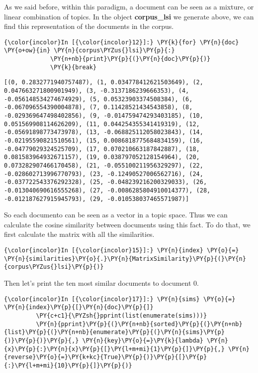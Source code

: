     As we said before, within this paradigm, a document can be seen as a
mixture, or linear combination of topics. In the object
\textbf{corpus\_lsi} we generate above, we can find this representation
of the documents in the corpus.

    \begin{Verbatim}[commandchars=\\\{\}]
{\color{incolor}In [{\color{incolor}12}]:} \PY{k}{for} \PY{n}{doc}  \PY{o+ow}{in} \PY{n}{corpus\PYZus{}lsi}\PY{p}{:}
             \PY{n+nb}{print}\PY{p}{(}\PY{n}{doc}\PY{p}{)}
             \PY{k}{break}
\end{Verbatim}

    \begin{Verbatim}[commandchars=\\\{\}]
[(0, 0.2832771940757487), (1, 0.034778412621503649), (2, 0.047663271800901949), (3, -0.3137186239666353), (4, -0.056148534274674929), (5, 0.05323903374508384), (6, -0.067096554390004878), (7, 0.11428521434543858), (8, -0.029369647498402856), (9, -0.014759474293403185), (10, 0.051569908114626209), (11, 0.044254355341419319), (12, -0.05691898773473978), (13, -0.068825112058023843), (14, -0.02195590821510561), (15, 0.0086818775684834159), (16, -0.04779029324525709), (17, 0.070210663187842887), (18, 0.081583964932671157), (19, 0.038797052128154964), (20, 0.073282907466170458), (21, -0.055100211956329297), (22, -0.028602713996770793), (23, -0.12490527006562716), (24, -0.037722543376292328), (25, -0.048239216200329033), (26, -0.013040690616555268), (27, -0.0086285804910014377), (28, -0.012187627915945793), (29, -0.010538037465571987)]

    \end{Verbatim}

    So each documento can be seen as a vector in a topic space. Thus we can
calculate the cosine similarity between documents using this fact. To do
that, we first calculate the matrix with all the similarities.

    \begin{Verbatim}[commandchars=\\\{\}]
{\color{incolor}In [{\color{incolor}15}]:} \PY{n}{index} \PY{o}{=} \PY{n}{similarities}\PY{o}{.}\PY{n}{MatrixSimilarity}\PY{p}{(}\PY{n}{corpus\PYZus{}lsi}\PY{p}{)}
\end{Verbatim}

    Then let's print the ten most similar documents to document \(0\).

    \begin{Verbatim}[commandchars=\\\{\}]
{\color{incolor}In [{\color{incolor}17}]:} \PY{n}{sims} \PY{o}{=} \PY{n}{index}\PY{p}{[}\PY{n}{doc}\PY{p}{]}
         \PY{c+c1}{\PYZsh{}pprint(list(enumerate(sims)))}
         \PY{n}{pprint}\PY{p}{(}\PY{n+nb}{sorted}\PY{p}{(}\PY{n+nb}{list}\PY{p}{(}\PY{n+nb}{enumerate}\PY{p}{(}\PY{n}{sims}\PY{p}{)}\PY{p}{)}\PY{p}{,} \PY{n}{key}\PY{o}{=}\PY{k}{lambda} \PY{n}{x}\PY{p}{:}\PY{n}{x}\PY{p}{[}\PY{l+m+mi}{1}\PY{p}{]}\PY{p}{,} \PY{n}{reverse}\PY{o}{=}\PY{k+kc}{True}\PY{p}{)}\PY{p}{[}\PY{p}{:}\PY{l+m+mi}{10}\PY{p}{]}\PY{p}{)}
\end{Verbatim}

